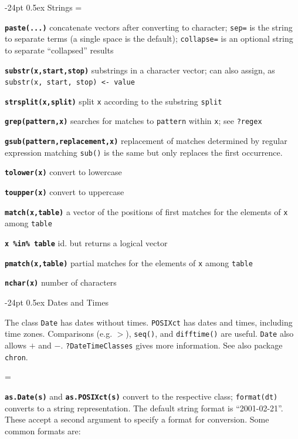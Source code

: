 \documentclass[10pt,landscape]{article}
\makeatletter
\renewcommand\section{\@startsection{section}{1}{0mm}%
                                     {-24pt}%
                                     {0.5ex}%
                                {\color{blue}\normalfont\large\bfseries}}
\newcommand{\code}{\texttt}
\newcommand{\bcode}[1]{\texttt{\textbf{#1}}}
\makeatother
\begin{document}
\begin{multicols}{3}
\section{Strings}
\everypar={\hangindent=9mm}

\bcode{paste(...)} concatenate vectors after converting to character;
\code{sep=} is the string to separate terms (a single space is the default);
\code{collapse=} is an optional string to separate ``collapsed'' results

\bcode{substr(x,start,stop)} substrings in a character vector; can also assign, as \code{substr(x, start, stop) <- value}

\bcode{strsplit(x,split)} split \code{x} according to the substring \code{split}

\bcode{grep(pattern,x)} searches for matches to \code{pattern}
     within \code{x}; see \code{?regex}

\bcode{gsub(pattern,replacement,x)} replacement of matches determined by
regular expression matching \code{sub()} is the same but only
replaces the first occurrence. 

\bcode{tolower(x)} convert to lowercase

\bcode{toupper(x)} convert to uppercase

\bcode{match(x,table)} a vector of the positions of first matches for the elements of \code{x} among \code{table}

\bcode{x \%in\% table} id. but returns a logical vector 

\bcode{pmatch(x,table)} partial matches for the elements of \code{x} among \code{table}

\bcode{nchar(x)} number of characters


\section{\color{blue}Dates and Times}

The class \code{Date} has dates without times.  \code{POSIXct} has
dates and times, including time zones. Comparisons (e.g. $>$),
\code{seq()}, and \code{difftime()} are useful. \code{Date} also allows
$+$ and $-$. \code{?DateTimeClasses} gives more information. See also package
\code{chron}.

\everypar={\hangindent=9mm}

\bcode{as.Date(s)} and \bcode{as.POSIXct(s)} convert to the respective
class; \code{format(dt)} converts to a string representation. The
default string format is ``2001-02-21''. These accept a second argument
to specify a format for conversion. Some common formats are:


\end{multicols}
\end{document}
